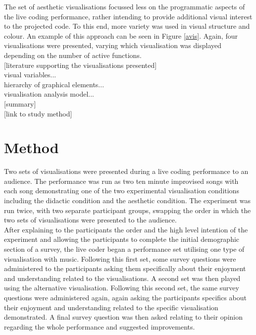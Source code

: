 \documentclass{article}
\begin{document}
The set of aesthetic visualisations focussed less on the programmatic aspects of the live coding performance, rather intending to provide additional visual interest to the projected code. To this end, more variety was used in visual structure and colour. An example of this approach can be seen in Figure \ref{avis}. Again, four visualisations were presented, varying which visualisation was displayed depending on the number of active functions.\\

[literature supporting the visualisations presented]\\

visual variables...\\

hierarchy of graphical elements...\\

visualisation analysis model...\\

[summary]\\

[link to study method]\\

\section{Method}
Two sets of visualisations were presented during a live coding performance to an audience. The performance was run as two ten minute improvised songs with each song demonstrating one of the two experimental visualisation conditions including the didactic condition and the aesthetic condition. The experiment was run twice, with two separate participant groups, swapping the order in which the two sets of visualisations were presented to the audience.\\

After explaining to the participants the order and the high level intention of the experiment and allowing the participants to complete the initial demographic section of a survey, the live coder began a performance set utilising one type of visualisation with music. Following this first set, some survey questions were administered to the participants asking them specifically about their enjoyment and understanding related to the visualisations. A second set was then played using the alternative visualisation. Following this second set, the same survey questions were administered again, again asking the participants specifics about their enjoyment and understanding related to the specific visualisation demonstrated. A final survey question was then asked relating to their opinion regarding the whole performance and suggested improvements.
\end{document}
